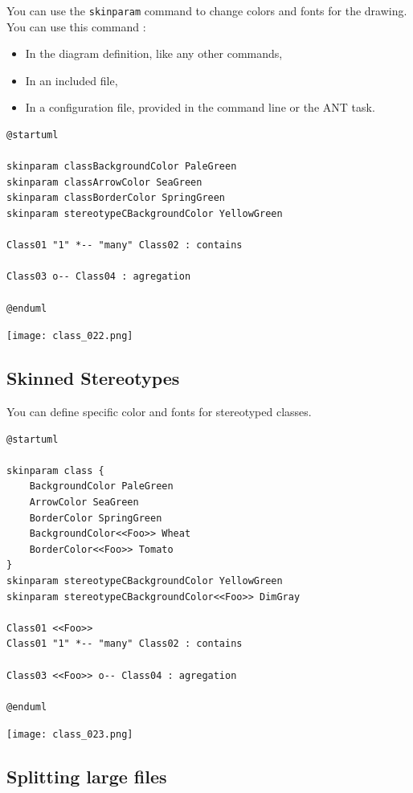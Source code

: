 You can use the \texttt{skinparam} command to change colors and fonts for the
drawing. You can use this command :

\begin{itemize}
  \item In the diagram definition, like any other commands,
  \item In an included file,
  \item In a configuration file, provided in the command line or the ANT task.
\end{itemize}

\begin{lstlisting}
@startuml

skinparam classBackgroundColor PaleGreen
skinparam classArrowColor SeaGreen
skinparam classBorderColor SpringGreen
skinparam stereotypeCBackgroundColor YellowGreen

Class01 "1" *-- "many" Class02 : contains

Class03 o-- Class04 : agregation

@enduml
\end{lstlisting}
\begin{center}
\texttt{[image: class\_022.png]}
\end{center}

\newpage \subsection{Skinned Stereotypes}
You can define specific color and fonts for stereotyped classes.

\begin{lstlisting}
@startuml

skinparam class {
	BackgroundColor PaleGreen
	ArrowColor SeaGreen
	BorderColor SpringGreen
	BackgroundColor<<Foo>> Wheat
	BorderColor<<Foo>> Tomato
}
skinparam stereotypeCBackgroundColor YellowGreen
skinparam stereotypeCBackgroundColor<<Foo>> DimGray

Class01 <<Foo>>
Class01 "1" *-- "many" Class02 : contains

Class03 <<Foo>> o-- Class04 : agregation

@enduml
\end{lstlisting}
\begin{center}
\texttt{[image: class\_023.png]}
\end{center}


\newpage \subsection{Splitting large files}

